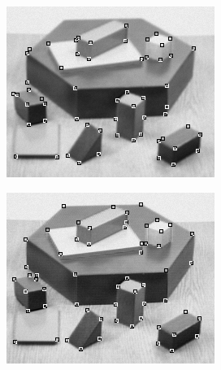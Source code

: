 \documentclass[letterpaper, 10 pt, conference]{ieeeconf}  %
\begin{document}
\begin{figure}[htbp]
\begin{subfigure}[b]{0.49\linewidth}
      \includegraphics[width=\linewidth]{experiments/blocks_ECSS.png}
      \caption{}
    \end{subfigure}
       	\begin{subfigure}[b]{0.49\linewidth}
    	\includegraphics[width=\linewidth]{experiments/blocks_rcss.png}
    	\caption{}
   	\end{subfigure}
  	     \begin{subfigure}[b]{0.49\linewidth}

\end{subfigure}
\end{figure}
\end{document}
